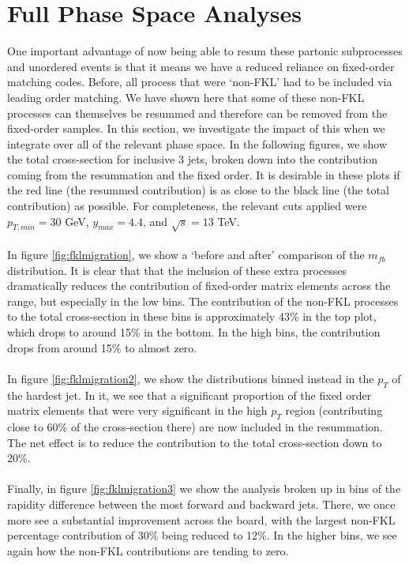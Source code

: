 \section{Full Phase Space Analyses}
One important advantage of now being able to resum these partonic subprocesses and unordered events is that it means we have a reduced reliance on fixed-order matching codes. Before, all process that were `non-FKL' had to be included via leading order matching. We have shown here that some of these non-FKL processes can themselves be resummed and therefore can be removed from the fixed-order samples. In this section, we investigate the impact of this when we integrate over all of the relevant phase space. In the following figures, we show the total cross-section for inclusive 3 jets, broken down into the contribution coming from the resummation and the fixed order. It is desirable in these plots if the red line (the resummed contribution) is as close to the black line (the total contribution) as possible. For completeness, the relevant cuts applied were $p_{T,min} = 30$ GeV, $y_{max} = 4.4$, and $\sqrt{s} = 13$ TeV. \\
\\
In figure \ref{fig:fklmigration}, we show a `before and after' comparison of the $m_{fb}$ distribution. It is clear that that the inclusion of these extra processes dramatically reduces the contribution of fixed-order matrix elements across the range, but especially in the low bins. The contribution of the non-FKL processes to the total cross-section in these bins is approximately 43\% in the top plot, which drops to around 15\% in the bottom. In the high bins, the contribution drops from around 15\% to almost zero. \\
\\
In figure \ref{fig:fklmigration2}, we show the distributions binned instead in the $p_T$ of the hardest jet. In it, we see that a significant proportion of the fixed order matrix elements that were very significant in the high $p_T$ region (contributing close to 60\% of the cross-section there) are now included in the resummation. The net effect is to reduce the contribution to the total cross-section down to 20\%. \\
\\
Finally, in figure \ref{fig:fklmigration3} we show the analysis broken up in bins of the rapidity difference between the most forward and backward jets. There, we once more see a substantial improvement across the board, with the largest non-FKL percentage contribution of 30\% being reduced to 12\%. In the higher bins, we see again how the non-FKL contributions are tending to zero. 


